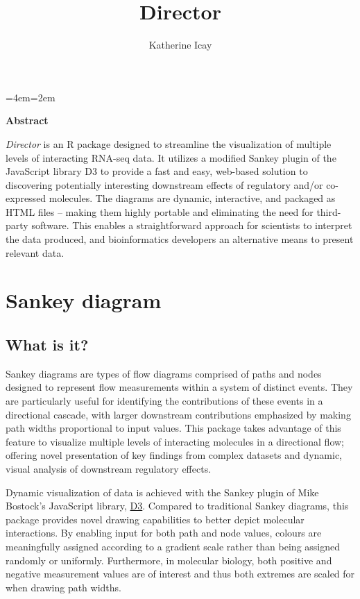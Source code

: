 \documentclass[a4paper]{article}
\title{Director}
\author{Katherine Icay}
\begin{document}

\newenvironment{blockquote}{%
    \par%
    \medskip
    \leftskip=4em\rightskip=2em%
\ignorespaces\justify}{%
    \par\medskip}
\maketitle

\begin{blockquote}
\begin{center}\textbf{Abstract}\end{center}
\noindent \textit{Director} is an R package designed to streamline the visualization of multiple levels of interacting RNA-seq data.  It utilizes a modified Sankey plugin of the JavaScript library D3 to provide a fast and easy, web-based solution to discovering potentially interesting downstream effects of regulatory and/or co-expressed molecules. The diagrams are dynamic, interactive, and packaged as HTML files -- making them highly portable and eliminating the need for third-party software. This enables a straightforward approach for scientists to interpret the data produced, and bioinformatics developers an alternative means to present relevant data.
\end{blockquote}

\tableofcontents

\section{Sankey diagram}
    \subsection{What is it?}
Sankey diagrams are types of flow diagrams comprised of paths and nodes designed to represent flow measurements within a system of distinct events. They are particularly useful for identifying the contributions of these events in a directional cascade, with larger downstream contributions emphasized by making path widths proportional to input values. This package takes advantage of this feature to visualize multiple levels of interacting molecules in a directional flow; offering novel presentation of key findings from complex datasets and dynamic, visual analysis of downstream regulatory effects. 

Dynamic visualization of data is achieved with the Sankey plugin of Mike Bostock's JavaScript library, \href{http://d3js.org/}{D3}. Compared to traditional Sankey diagrams, this package provides novel drawing capabilities to better depict molecular interactions. By enabling input for both path and node values, colours are meaningfully assigned according to a gradient scale rather than being assigned randomly or uniformly. Furthermore, in molecular biology, both positive and negative measurement values are of interest and thus both extremes are scaled for when drawing path widths.
\end{document}
